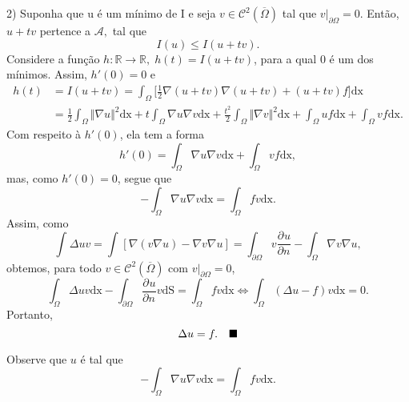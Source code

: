 \documentclass[../pde_notes.tex]{subfiles}
\begin{document}
\begin{proof*}
	2) Suponha que u é um mínimo de I e seja \(v\in \mathcal{C}^{2}(\overline{\Omega })\) tal que \(v|_{\partial \Omega } = 0\). Então, \(u+tv\) pertence a \(\mathcal{A},\) tal que
	\[
		I(u) \leq I(u+tv).
	\]
	Considere a função \(h:\mathbb{R}\rightarrow \mathbb{R},\; h(t) = I(u+tv)\), para a qual 0 é um dos mínimos. Assim, \(h'(0) = 0\) e
	\begin{align*}
		h(t) & = I(u+tv)  = \int_{\Omega }^{}\biggl[\frac{1}{2}\nabla (u+tv)\nabla (u+tv) + (u+tv)f\biggr] \mathrm{dx}                                                                                                                                                         \\
		     & = \frac{1}{2}\int_{\Omega }^{}\Vert \nabla u \Vert^{2} \mathrm{dx} + t \int_{\Omega }^{}\nabla u \nabla v \mathrm{dx}+\frac{t^{2}}{2}\int_{\Omega }^{}\Vert \nabla v \Vert^{2} \mathrm{dx} + \int_{\Omega }^{}uf \mathrm{dx} + \int_{\Omega }^{}vf \mathrm{dx}.
	\end{align*}
	Com respeito à \(h'(0)\), ela tem a forma
	\[
		h'(0) = \int_{\Omega }^{}\nabla u \nabla v \mathrm{dx} + \int_{\Omega }^{}vf \mathrm{dx},
	\]
	mas, como \(h'(0) = 0\), segue que
	\[
		-\int_{\Omega }^{}\nabla u \nabla v \mathrm{dx} = \int_{\Omega }^{}fv \mathrm{dx}.
	\]
	Assim, como
	\[
		\int_{}^{}\Delta uv = \int_{}^{}[\nabla (v\nabla u) - \nabla v\nabla u] = \int_{\partial \Omega }^{}v \frac{\partial^{}u}{\partial n^{}} - \int_{\Omega }^{}\nabla v \nabla u,
	\]
	obtemos, para todo \(v\in \mathcal{C}^{2}(\overline{\Omega })\) com \(v|_{\partial \Omega } = 0\),
	\[
		\int_{\Omega }^{}\Delta uv \mathrm{dx} - \int_{\partial \Omega }^{}\frac{\partial^{}u}{\partial n^{}}v \mathrm{dS} = \int_{\Omega }^{}fv \mathrm{dx} \Leftrightarrow \int_{\Omega }^{}(\Delta u-f)v \mathrm{dx} = 0.
	\]
	Portanto,
	\[
		\Delta u = f.\quad \text{$\blacksquare$}
	\]
\end{proof*}
Observe que \(u\) é tal que
\[
	-\int_{\Omega }^{}\nabla u \nabla v \mathrm{dx} = \int_{\Omega }^{}fv \mathrm{dx}.
\]
\end{document}
